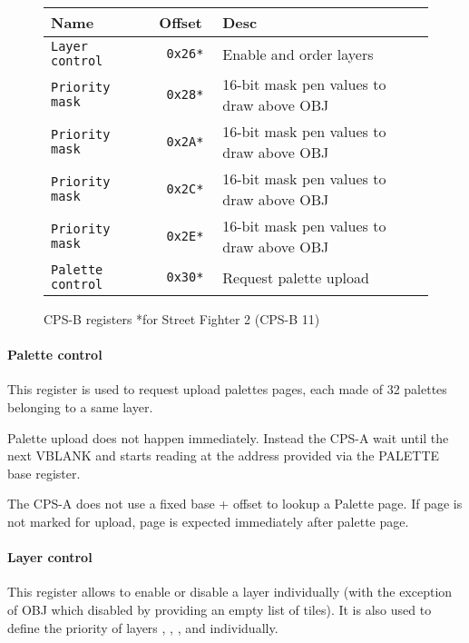  \begin{figure}[H]
\begin{tabularx}{\textwidth}{llX}
  \toprule    
  \textbf{Name } & \textbf{ Offset }  & \textbf{Desc }\\  
  \toprule   
  \texttt{Layer control} & \texttt{ 0x26* } & Enable and order layers\\      
\texttt{Priority mask} & \texttt{ 0x28* } &  16-bit mask pen values to draw above OBJ   \\  
\texttt{Priority mask} & \texttt{ 0x2A* } &  16-bit mask pen values to draw above OBJ   \\  
\texttt{Priority mask} & \texttt{ 0x2C* } &  16-bit mask pen values to draw above OBJ   \\  
\texttt{Priority mask} & \texttt{ 0x2E* } &  16-bit mask pen values to draw above OBJ  \\  
\texttt{Palette control} & \texttt{ 0x30* } &  Request palette upload\\ 
  \toprule   
\end{tabularx}
\caption*{CPS-B registers *for Street Fighter 2	(CPS-B 11)}
\end{figure}

\paragraph{Palette control}This register is used to request upload palettes pages, each made of 32 palettes belonging to a same layer.

 

Palette upload does not happen immediately. Instead the CPS-A wait until the next VBLANK and starts reading at the address provided via the PALETTE base register.

The CPS-A does not use a fixed base + offset to lookup a Palette page. If  page is not marked for upload,  page is expected immediately after  palette page.



\paragraph{Layer control} This register allows to enable or disable a layer individually (with the exception of OBJ which disabled by providing an empty list of tiles). It is also used to define the priority of layers , , , and  individually.

